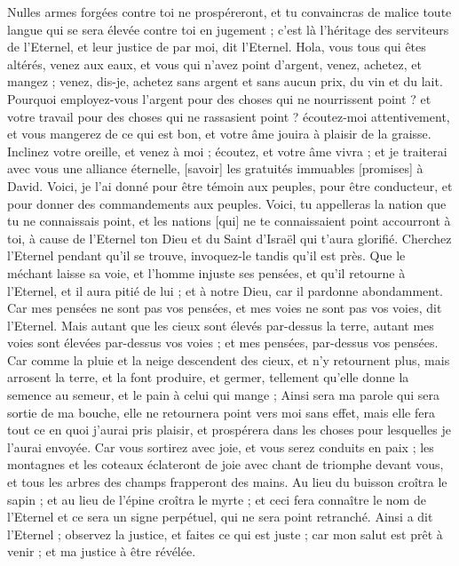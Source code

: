 \begin{multicols}{2}
Nulles armes forgées contre toi ne prospéreront, et tu convaincras de malice toute langue qui se sera élevée contre toi en jugement ; c'est là l'héritage des serviteurs de l'Eternel, et leur justice de par moi, dit l'Eternel.
\VerseOne{}Hola, vous tous qui êtes altérés, venez aux eaux, et vous qui n'avez point d'argent, venez, achetez, et mangez ; venez, dis-je, achetez sans argent et sans aucun prix, du vin et du lait.
Pourquoi employez-vous l'argent pour des choses qui ne nourrissent point ? et votre travail pour des choses qui ne rassasient point ? écoutez-moi attentivement, et vous mangerez de ce qui est bon, et votre âme jouira à plaisir de la graisse.
Inclinez votre oreille, et venez à moi ; écoutez, et votre âme vivra ; et je traiterai avec vous une alliance éternelle, [savoir] les gratuités immuables [promises] à David.
Voici, je l'ai donné pour être témoin aux peuples, pour être conducteur, et pour donner des commandements aux peuples.
Voici, tu appelleras la nation que tu ne connaissais point, et les nations [qui] ne te connaissaient point accourront à toi, à cause de l'Eternel ton Dieu et du Saint d'Israël qui t'aura glorifié.
Cherchez l'Eternel pendant qu'il se trouve, invoquez-le tandis qu'il est près.
Que le méchant laisse sa voie, et l'homme injuste ses pensées, et qu'il retourne à l'Eternel, et il aura pitié de lui ; et à notre Dieu, car il pardonne abondamment.
Car mes pensées ne sont pas vos pensées, et mes voies ne sont pas vos voies, dit l'Eternel.
Mais autant que les cieux sont élevés par-dessus la terre, autant mes voies sont élevées par-dessus vos voies ; et mes pensées, par-dessus vos pensées.
Car comme la pluie et la neige descendent des cieux, et n'y retournent plus, mais arrosent la terre, et la font produire, et germer, tellement qu'elle donne la semence au semeur, et le pain à celui qui mange ;
Ainsi sera ma parole qui sera sortie de ma bouche, elle ne retournera point vers moi sans effet, mais elle fera tout ce en quoi j'aurai pris plaisir, et prospérera dans les choses pour lesquelles je l'aurai envoyée.
Car vous sortirez avec joie, et vous serez conduits en paix ; les montagnes et les coteaux éclateront de joie avec chant de triomphe devant vous, et tous les arbres des champs frapperont des mains.
Au lieu du buisson croîtra le sapin ; et au lieu de l'épine croîtra le myrte ; et ceci fera connaître le nom de l'Eternel et ce sera un signe perpétuel, qui ne sera point retranché.
\VerseOne{}Ainsi a dit l'Eternel ; observez la justice, et faites ce qui est juste ; car mon salut est prêt à venir ; et ma justice à être révélée.

\end{multicols}
